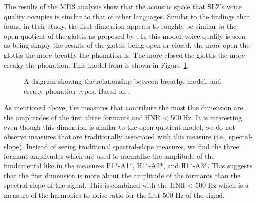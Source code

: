 The results of the MDS analysis show that the acoustic space that SLZ's voice quality occupies is similar to that of other languages. Similar to the findings that \citet{keatingCrosslanguageAcousticSpace2023} found in their study, the first dimension appears to roughly be similar to the open quotient of the glottis as proposed by \citet{gordonPhonationTypesCrosslinguistic2001}. In  this model, voice quality is seen as being simply the results of the glottis being open or closed. the more open the glottis the more breathy the phonation is. The more closed the glottis the more creaky the phonation. This model from \citet{gordonPhonationTypesCrosslinguistic2001} is shown in Figure~\ref{fig:phonation_types}. 

\begin{figure}[h!]
    \centering
    \caption{A diagram showing the relationship between breathy, modal, and creaky phonation types. Based on \citet{gordonPhonationTypesCrosslinguistic2001}.}
    \label{fig:phonation_types}
\end{figure}

As mentioned above, the measures that contribute the most this dimension are the amplitudes of the first three formants and HNR < 500 Hz. It is interesting even though this dimension is similar to the open-quotient model, we do not observe measures that are traditionally associated with this measure (i.e., spectal-slope). Instead of seeing traditional spectral-slope measures, we find the three formant amplitudes which are used to normalize the amplitude of the fundamental like in the measures H1*-A1*, H1*-A2*, and H1*-A3*. This suggests that the first dimension is more about the amplitude of the formants than the spectral-slope of the signal. This is combined with the HNR < 500 Hz which is a measure of the harmonics-to-noise ratio for the first 500 Hz of the signal. 

